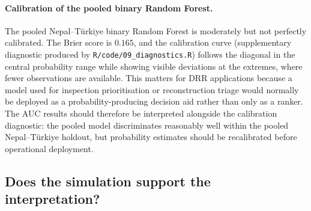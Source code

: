 \documentclass[11pt,a4paper]{article}
\begin{document}
\paragraph{Calibration of the pooled binary Random Forest.} The pooled Nepal--T\"urkiye binary Random Forest is moderately but not perfectly calibrated. The Brier score is $0.165$, and the calibration curve (supplementary diagnostic produced by \texttt{R/code/09\_diagnostics.R}) follows the diagonal in the central probability range while showing visible deviations at the extremes, where fewer observations are available. This matters for DRR applications because a model used for inspection prioritisation or reconstruction triage would normally be deployed as a probability-producing decision aid rather than only as a ranker. The AUC results should therefore be interpreted alongside the calibration diagnostic: the pooled model discriminates reasonably well within the pooled Nepal--T\"urkiye holdout, but probability estimates should be recalibrated before operational deployment.


\subsection{Does the simulation support the interpretation?}
\label{subsec:results-mechanism-and-simulation}
\end{document}
